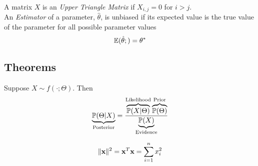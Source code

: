 \documentclass[11pt,a4paper]{article}
\begin{document}
A matrix $X$ is an \textit{Upper Triangle Matrix} if $X_{i,j}=0$ for $i>j$.\\

An \textit{Estimator} of a parameter, $\hat\theta$, is unbiased if its expected value is the true value of the parameter for all possible parameter values
$$\mathbb{E}(\hat\theta;)=\theta^*$$


\subsection{Theorems}

Suppose $X\sim f(\cdot;\Theta)$. Then
$$\underbrace{\mathbb{P}(\Theta|X)}_\text{Posterior}=\frac{\overbrace{\mathbb{P}(X|\Theta)}^\text{Likelihood}\overbrace{\mathbb{P}(\Theta)}^\text{Prior}}{\underbrace{\mathbb{P}(X)}_\text{Evidence}}$$

$$\|\textbf{x}\|^2=\textbf{x}^T\textbf{x}=\sum_{i=1}^nx_i^2$$
\end{document}

